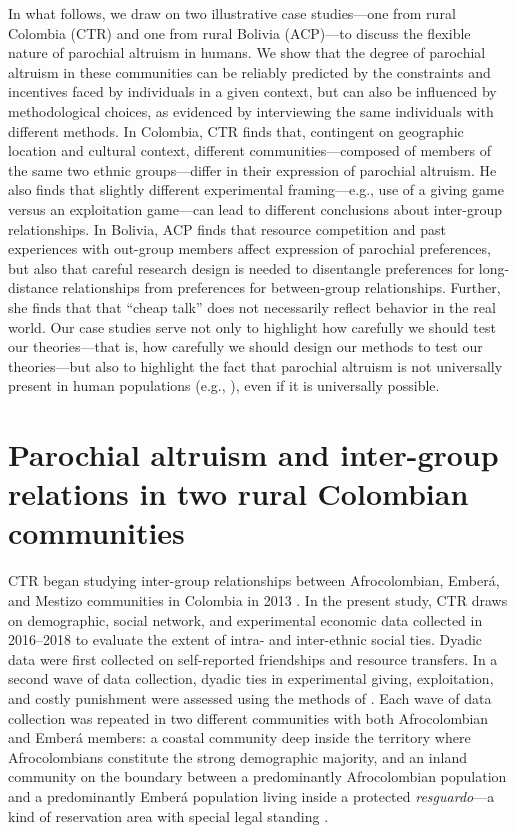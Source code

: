 \documentclass[bibauthoryear]{aa}
\begin{document}
In what follows, we draw on two illustrative case studies---one from rural Colombia (CTR) and one from rural Bolivia (ACP)---to discuss the flexible nature of parochial altruism in humans. We show that the degree of parochial altruism in these communities can be reliably predicted by the constraints and incentives faced by individuals in a given context, but can also be influenced by methodological choices, as evidenced by interviewing the same individuals with different methods. In Colombia, CTR finds that, contingent on  geographic location and cultural context, different communities---composed of members of the same two ethnic groups---differ in their expression of parochial altruism. He also finds that slightly different experimental framing---e.g., use of a giving game versus an exploitation game---can lead to different conclusions about inter-group relationships. In Bolivia, ACP finds that resource competition and past experiences with out-group members affect expression of parochial preferences, but also that careful research design is needed to disentangle preferences for long-distance relationships from preferences for between-group relationships. Further, she finds that that ``cheap talk'' does not necessarily reflect behavior in the real world. Our case studies serve not only to highlight how carefully we should test our theories---that is, how carefully we should design our methods to test our theories---but also to highlight the fact that parochial altruism is not universally present in human populations (e.g., \citep{brewer1976ethnocentrism}), even if it is universally possible.

\section{Parochial altruism and inter-group relations in two rural Colombian communities}
CTR began studying inter-group relationships between  Afrocolombian, Ember\'a, and  Mestizo communities in Colombia in 2013 \citep{ross2015frequency}. In the present study, CTR draws on demographic, social network, and experimental economic data collected in 2016--2018 to evaluate the extent of intra- and inter-ethnic social ties. Dyadic data were first collected on self-reported friendships and resource transfers. In a second wave of data collection, dyadic ties in experimental giving, exploitation, and costly punishment were assessed using the methods of \citet{gervais2017rich}. Each wave of data collection was repeated in two different communities with both Afrocolombian and Ember\'a members: a coastal community deep inside the territory where Afrocolombians constitute the strong demographic majority, and an inland community \citep[previously studied by][]{Cay73} on the boundary between a predominantly Afrocolombian population and a predominantly Ember\'a population living inside  a protected \emph{resguardo}---a kind of  reservation area with special legal standing \citep{MORAVERA2016}.
\end{document}
